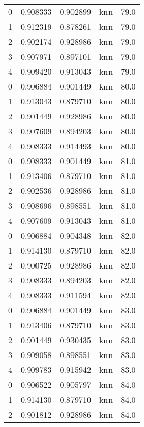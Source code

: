 \begin{tabular}{rrrlr}
     0 & 0.908333 & 0.902899 &      knn &       79.0 \\
     1 & 0.912319 & 0.878261 &      knn &       79.0 \\
     2 & 0.902174 & 0.928986 &      knn &       79.0 \\
     3 & 0.907971 & 0.897101 &      knn &       79.0 \\
     4 & 0.909420 & 0.913043 &      knn &       79.0 \\
     0 & 0.906884 & 0.901449 &      knn &       80.0 \\
     1 & 0.913043 & 0.879710 &      knn &       80.0 \\
     2 & 0.901449 & 0.928986 &      knn &       80.0 \\
     3 & 0.907609 & 0.894203 &      knn &       80.0 \\
     4 & 0.908333 & 0.914493 &      knn &       80.0 \\
     0 & 0.908333 & 0.901449 &      knn &       81.0 \\
     1 & 0.913406 & 0.879710 &      knn &       81.0 \\
     2 & 0.902536 & 0.928986 &      knn &       81.0 \\
     3 & 0.908696 & 0.898551 &      knn &       81.0 \\
     4 & 0.907609 & 0.913043 &      knn &       81.0 \\
     0 & 0.906884 & 0.904348 &      knn &       82.0 \\
     1 & 0.914130 & 0.879710 &      knn &       82.0 \\
     2 & 0.900725 & 0.928986 &      knn &       82.0 \\
     3 & 0.908333 & 0.894203 &      knn &       82.0 \\
     4 & 0.908333 & 0.911594 &      knn &       82.0 \\
     0 & 0.906884 & 0.901449 &      knn &       83.0 \\
     1 & 0.913406 & 0.879710 &      knn &       83.0 \\
     2 & 0.901449 & 0.930435 &      knn &       83.0 \\
     3 & 0.909058 & 0.898551 &      knn &       83.0 \\
     4 & 0.909783 & 0.915942 &      knn &       83.0 \\
     0 & 0.906522 & 0.905797 &      knn &       84.0 \\
     1 & 0.914130 & 0.879710 &      knn &       84.0 \\
     2 & 0.901812 & 0.928986 &      knn &       84.0 \\

\end{tabular}
